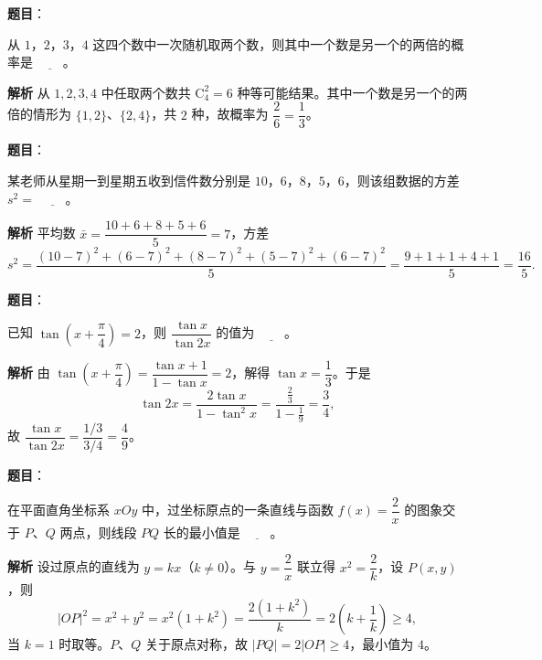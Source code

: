 \begin{answer}

\textbf{题目}：

从 $1$，$2$，$3$，$4$ 这四个数中一次随机取两个数，则其中一个数是另一个的两倍的概率是 $\underline{\qquad}$。

\textbf{解析}
从 $1,2,3,4$ 中任取两个数共 $\mathrm C_4^2=6$ 种等可能结果。其中一个数是另一个的两倍的情形为 $\{1,2\}$、$\{2,4\}$，共 $2$ 种，故概率为 $\dfrac26=\dfrac13$。


\end{answer}
\begin{answer}

\textbf{题目}：

某老师从星期一到星期五收到信件数分别是 $10$，$6$，$8$，$5$，$6$，则该组数据的方差 $s^2=$ $\underline{\qquad}$。

\textbf{解析}
平均数 $\bar x=\dfrac{10+6+8+5+6}{5}=7$，方差
\nopagebreak[4]
\[s^2=\frac{(10-7)^2+(6-7)^2+(8-7)^2+(5-7)^2+(6-7)^2}{5}=\frac{9+1+1+4+1}{5}=\frac{16}5.\]


\end{answer}
\begin{answer}

\textbf{题目}：

已知 $\tan\left(x+\dfrac\pi4\right)=2$，则 $\dfrac{\tan x}{\tan2x}$ 的值为 $\underline{\qquad}$。

\textbf{解析}
由 $\tan\left(x+\dfrac\pi4\right)=\dfrac{\tan x+1}{1-\tan x}=2$，解得 $\tan x=\dfrac13$。于是
\nopagebreak[4]
\[\tan2x=\frac{2\tan x}{1-\tan^2x}=\frac{\frac23}{1-\frac19}=\frac34,\]
故 $\dfrac{\tan x}{\tan2x}=\dfrac{1/3}{3/4}=\dfrac49$。


\end{answer}
\begin{answer}

\textbf{题目}：

在平面直角坐标系 $xOy$ 中，过坐标原点的一条直线与函数 $f(x)=\dfrac2x$ 的图象交于 $P$、$Q$ 两点，则线段 $PQ$ 长的最小值是 $\underline{\qquad}$。

\textbf{解析}
设过原点的直线为 $y=kx$（$k\neq0$）。与 $y=\dfrac2x$ 联立得 $x^2=\dfrac2k$，设 $P(x,y)$，则
\nopagebreak[4]
\[|OP|^2=x^2+y^2=x^2(1+k^2)=\frac{2(1+k^2)}k=2\left(k+\frac1k\right)\geqslant4,\]
当 $k=1$ 时取等。$P$、$Q$ 关于原点对称，故 $|PQ|=2|OP|\geqslant4$，最小值为 $4$。


\end{answer}
